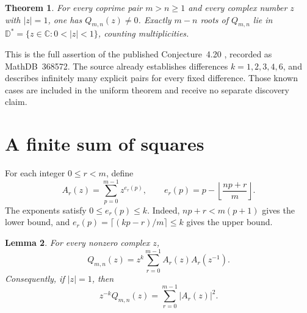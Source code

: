 \documentclass[11pt]{article}
\newtheorem{theorem}{Theorem}
\newtheorem{lemma}[theorem]{Lemma}
\newcommand{\D}{\mathbb D}
\begin{document}
\begin{theorem}\label{thm:main}
For every coprime pair $m>n\geq1$ and every complex number $z$ with
$|z|=1$, one has $Q_{m,n}(z)\ne0$. Exactly $m-n$ roots of $Q_{m,n}$
lie in $\D^*=\{z\in\mathbb C:0<|z|<1\}$, counting multiplicities.
\end{theorem}

This is the full assertion of the published Conjecture~4.20
\cite{EM}, recorded as MathDB~368572. The source already establishes
differences $k=1,2,3,4,6$, and describes infinitely many explicit pairs
for every fixed difference. Those known cases are included in the
uniform theorem and receive no separate discovery claim.

\section{A finite sum of squares}
For each integer $0\leq r<m$, define
\begin{equation}\label{eq:A}
 A_r(z)=\sum_{p=0}^{m-1}z^{e_r(p)},\qquad
 e_r(p)=p-\left\lfloor\frac{np+r}{m}\right\rfloor.
\end{equation}
The exponents satisfy $0\leq e_r(p)\leq k$. Indeed,
$np+r<m(p+1)$ gives the lower bound, and
$e_r(p)=\lceil(kp-r)/m\rceil\leq k$ gives the upper bound.

\begin{lemma}\label{lem:SOS}
For every nonzero complex $z$,
\begin{equation}\label{eq:LaurentSOS}
 Q_{m,n}(z)=z^k\sum_{r=0}^{m-1}A_r(z)A_r(z^{-1}).
\end{equation}
Consequently, if $|z|=1$, then
\begin{equation}\label{eq:SOS}
 z^{-k}Q_{m,n}(z)=\sum_{r=0}^{m-1}|A_r(z)|^2.
\end{equation}
\end{lemma}
\end{document}
